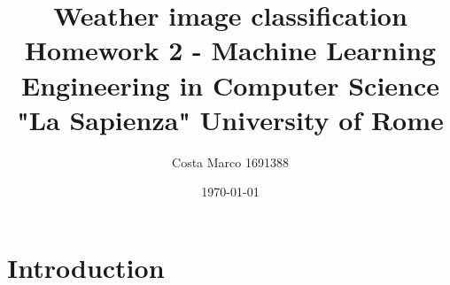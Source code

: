 \documentclass[11pt]{article}
\title{\textbf{Weather image classification} \\ \bigskip \large Homework 2 - Machine Learning \\ Engineering in Computer Science \\ "La Sapienza" University of Rome}
\author{Costa Marco 1691388}
\date{\today}
\begin{document}
\maketitle
\pagebreak
\tableofcontents
\pagebreak

\section{Introduction}
\end{document}
